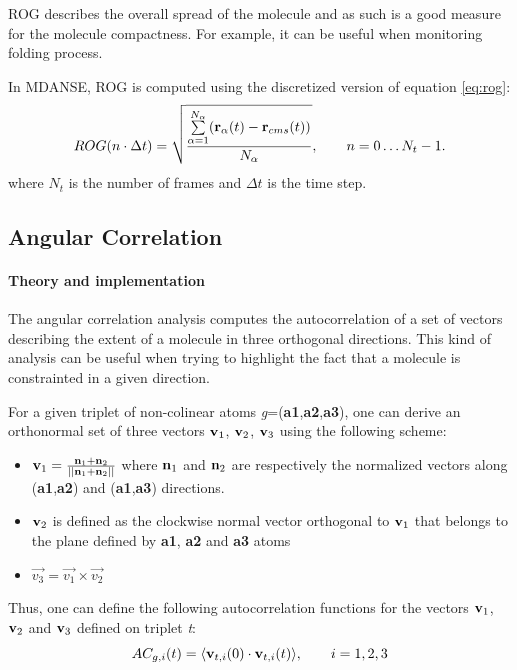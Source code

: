 \documentclass[a4paper,11pt]{article}
\begin{document}
\gls{ROG} describes the overall spread of the molecule and as such is a good measure for the molecule compactness. For
example, it can be useful when monitoring folding process.

In \gls{MDANSE}, \gls{ROG} is computed using the discretized version of equation \ref{eq:rog}:
\begin{equation}
\label{eq:rog_num}
ROG(n\cdot\Delta t) = \sqrt{\frac{\sum\limits_{\alpha = 1}^{N_{\alpha}}({\bf r}_{\alpha}(t) - {\bf r}_{cms}(t))}{N_{\alpha}}},
\qquad n = 0\ldots N_t - 1.
\end{equation}
where $N_t$ is the number of frames and $\Delta t$ is the time step.

\subsection{Angular Correlation}
\label{ac}
\paragraph{Theory and implementation\\}
\label{ac_theory}
The angular correlation analysis computes the autocorrelation of a set of vectors describing the extent of a molecule in three
orthogonal directions. This kind of analysis can be useful when trying to highlight the fact that a molecule is constrainted
in a given direction.

For a given triplet of non-colinear atoms \textit{g}=(\textbf{a1},\textbf{a2},\textbf{a3}), one can derive an orthonormal
set of three vectors ${\bf v}_1$, ${\bf v}_2$, ${\bf v}_3$ using the following scheme:

\begin{itemize}
\item ${\bf v}_1 = \frac{{\bf n}_{1} + {\bf n}_{2}}{||{\bf n}_{1} + {\bf n}_{2}||}$
where ${\bf n}_{1}$ and ${\bf n}_{2}$ are respectively the normalized vectors along (\textbf{a1},\textbf{a2})
and (\textbf{a1},\textbf{a3}) directions.
\item ${\bf v}_2$ is defined as the clockwise normal vector orthogonal to ${\bf v}_1$ that belongs to the plane
defined by \textbf{a1}, \textbf{a2} and \textbf{a3} atoms
\item $\vec{v_3} = \vec{v_1} \times \vec{v_2}$
\end{itemize}

Thus, one can define the following autocorrelation functions for the vectors ${\bf v}_1$, ${\bf v}_2$ and ${\bf v}_3$
defined on triplet \textit{t}:
\begin{equation}
\label{eq:ac_per_triplet}
AC_{g,i} (t) = \langle {\bf v}_{t,i}(0)\cdot{\bf v}_{t,i}(t)\rangle, \qquad  i = 1,2,3
\end{equation}
\end{document}
